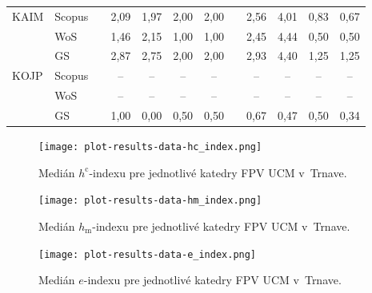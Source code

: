 \begin{table}
\begin{tabularx}{\textwidth}{XXp{1ex}ccccp{1ex}cccc}
    KAIM & Scopus & & 2,09  & 1,97 & 2,00  & 2,00 & & 2,56  & 4,01 & 0,83 & 0,67 \\
         & WoS    & & 1,46  & 2,15 & 1,00  & 1,00 & & 2,45  & 4,44 & 0,50 & 0,50 \\
         & GS     & & 2,87  & 2,75 & 2,00  & 2,00 & & 2,93  & 4,40 & 1,25 & 1,25 \\[1ex]
    KOJP & Scopus & & --    & --   & --    & --   & & --    & --   & --   & --   \\
         & WoS    & & --    & --   & --    & --   & & --    & --   & --   & --   \\
         & GS     & & 1,00  & 0,00 & 0,50  & 0,50 & & 0,67  & 0,47 & 0,50 & 0,34 \\
    \bottomrule
  \end{tabularx}
\end{table}

\begin{figure}
  \centering
  \texttt{[image: plot-results-data-hc\_index.png]}
  \caption[Medián $h^\mathrm{c}$-indexu pre jednotlivé katedry FPV UCM v~Trnave]%
  {Medián $h^\mathrm{c}$-indexu pre jednotlivé katedry FPV UCM v~Trnave.}
  \label{fig:hc-index.plot}
\end{figure}

\begin{figure}
  \centering
  \texttt{[image: plot-results-data-hm\_index.png]}
  \caption[Medián $h_\mathrm{m}$-indexu pre jednotlivé katedry FPV UCM v~Trnave]%
  {Medián $h_\mathrm{m}$-indexu pre jednotlivé katedry FPV UCM v~Trnave.}
  \label{fig:hm-index.plot}
\end{figure}

\begin{figure}
  \centering
  \texttt{[image: plot-results-data-e\_index.png]}
  \caption[Medián $e$-indexu pre jednotlivé katedry FPV UCM v~Trnave]%
  {Medián $e$-indexu pre jednotlivé katedry FPV UCM v~Trnave.}
  \label{fig:e-index.plot}
\end{figure}


